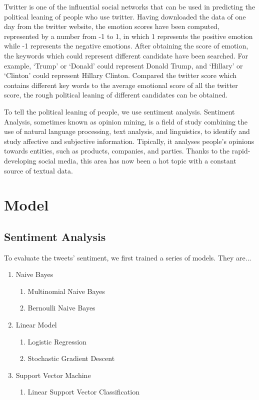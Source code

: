 \documentclass[12pt,a4paper]{report}
\begin{document}
    Twitter is one of the influential social networks that can be used in predicting the political leaning of people who use twitter. Having downloaded the data of one day from the twitter website, the emotion scores have been computed, represented by a number from -1 to 1, in which 1 represents the positive emotion while -1 represents the negative emotions. After obtaining the score of emotion, the keywords which could represent different candidate have been searched. For example, ‘Trump’ or ‘Donald’ could represent Donald Trump, and ‘Hillary’ or ‘Clinton’ could represent Hillary Clinton. Compared the twitter score which contains different key words to the average emotional score of all the twitter score, the rough political leaning of different candidates can be obtained.

    To tell the political leaning of people, we use sentiment analysis. Sentiment Analysis, sometimes known as opinion mining, is a field of study combining the use of natural language processing, text analysis, and linguistics, to identify and study affective and subjective information. Tipically, it analyses people’s opinions towards entities, such as products, companies, and parties. Thanks to the rapid-developing social media, this area has now been a hot topic with a constant source of textual data.



  \section{Model}

    \subsection{Sentiment Analysis}

      To evaluate the tweets' sentiment, we first trained a series of models. They are...

      \begin{enumerate}
        \item Naive Bayes
              \begin{enumerate}
                \item Multinomial Naive Bayes
                \item Bernoulli Naive Bayes
              \end{enumerate}
        \item Linear Model
              \begin{enumerate}
                \item Logistic Regression
                \item Stochastic Gradient Descent
              \end{enumerate}
        \item Support Vector Machine
              \begin{enumerate}
                \item Linear Support Vector Classification
              \end{enumerate}
      \end{enumerate}
\end{document}
